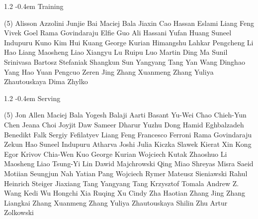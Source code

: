 \documentclass{llmxive}
\makeatletter
\providecommand{\paragraph}{  \@startsection{paragraph}{4}{\z@}    {1\baselineskip \@plus .2\baselineskip}    {-0.4em}    {\normalfont\normalsize\bfseries}}
\makeatother
\begin{document}
\vspace{-0.32\baselineskip}\paragraph{\footnotesize Training} \mbox{}
\vspace{-0.32\baselineskip}
\begingroup
\footnotesize
\begin{tasks}[label=\relax, label-width=0pt, item-indent=4pt](5)
\task Alisson Azzolini
\task Junjie Bai
\task Maciej Bala
\task Jiaxin Cao
\task Hassan Eslami
\task Liang Feng
\task Vivek Goel
\task Rama Govindaraju
\task Elfie Guo
\task Ali Hassani
\task Yufan Huang
\task Suneel Indupuru
\task Kuno Kim
\task Hui Kuang
\task George Kurian
\task Himangshu Lahkar
\task Pengcheng Li
\task Hao Liang
\task Maosheng Liao
\task Xiangyu Lu
\task Ruipu Luo
\task Martin Ding Ma
\task Sunil Srinivasa
\task Bartosz Stefaniak
\task Shangkun Sun
\task Yangyang Tang
\task Yan Wang
\task Dinghao Yang
\task Hao Yuan
\task Pengcuo Zeren
\task Jing Zhang
\task Xuanmeng Zhang
\task Yuliya Zhautouskaya
\task Dima Zhylko
\end{tasks}
\endgroup

\vspace{-0.32\baselineskip}\paragraph{\footnotesize Serving} \mbox{}
\vspace{-0.32\baselineskip}
\begingroup
\footnotesize
\begin{tasks}[label=\relax, label-width=0pt, item-indent=4pt](5)
\task Jon Allen
\task Maciej Bala
\task Yogesh Balaji
\task Aarti Basant
\task Yu-Wei Chao
\task Chieh-Yun Chen
\task Jeana Choi
\task Joyjit Daw
\task Sameer Dharur
\task Yuzhu Dong
\task Hamid Eghbalzadeh
\task Benedikt Falk
\task Sergiy Fefilatyev
\task Liang Feng
\task Francesco Ferroni
\task Rama Govindaraju
\task Zekun Hao
\task Suneel Indupuru
\task Atharva Joshi
\task Julia Kiczka
\task Slawek Kierat
\task Xin Kong
\task Egor Krivov
\task Chia-Wen Kuo
\task George Kurian
\task Wojciech Kutak
\task Zhaoshuo Li
\task Maosheng Liao
\task Tsung-Yi Lin
\task Dawid Majchrowski
\task Qing Miao
\task Shreyas Misra
\task Saeid Motiian
\task Seungjun Nah
\task Yatian Pang
\task Wojciech Rymer
\task Mateusz Sieniawski
\task Rahul Heinrich Steiger
\task Jiaxiang Tang
\task Yangyang Tang
\task Krzysztof Tomala
\task Andrew Z. Wang
\task Kedi Wu
\task Hongchi Xia
\task Ruqing Xu
\task Cindy Zha
\task Haotian Zhang
\task Jing Zhang
\task Liangkai Zhang
\task Xuanmeng Zhang
\task Yuliya Zhautouskaya
\task Shilin Zhu
\task Artur Zolkowski
\end{tasks}
\endgroup
\end{document}
